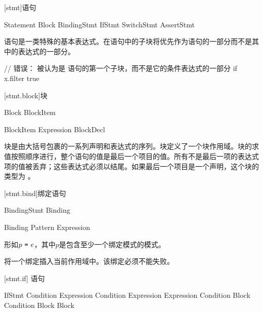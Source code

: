 
[stmt]{语句}

\begin{bnf}{Statement}
    Block \br
    BindingStmt \br
    IfStmt \br
    SwitchStmt \br
    AssertStmt
\end{bnf}

\pnum
语句是一类特殊的基本表达式。在语句中的子块将优先作为语句的一部分而不是其中的表达式的一部分。\enterexample

\begin{codeblock}
// 错误：  被认为是  语句的第一个子块，而不是它的条件表达式的一部分
if x.filter{ true }
\end{codeblock}

\exitexample

[stmt.block]{块}

\begin{bnf}{Block}
    \terminal{\{} BlockItem\bnfs\ \terminal{\}}
\end{bnf}

\begin{bnf}{BlockItem}
    Expression \terminal{;}\bnfq \br
    BlockDecl
\end{bnf}

\pnum
块是由大括号包裹的一系列声明和表达式的序列。块定义了一个块作用域。块的求值按照顺序进行，整个语句的值是最后一个项目的值。所有不是最后一项的表达式项的值被丢弃；这些表达式必须以\tcode{;}结尾。如果最后一个项目是一个声明，这个块的类型为 。

[stmt.bind]{绑定语句}

\begin{bnf}{BindingStmt}
    Binding \terminal{;}
\end{bnf}

\begin{bnf}{Binding}
    Pattern \terminal{=} Expression \terminal{;}
\end{bnf}

\pnum
{}形如$p\ \tcode{=}\ e$，其中$p$是包含至少一个绑定模式的模式。

\pnum
{}将一个绑定插入当前作用域中。该绑定必须不能失败。

[stmt.if]{ 语句}

\begin{bnf}{IfStmt}
     Condition  Expression \br
     Condition  Expression  Expression \br
     Condition Block \br
     Condition Block  Block
\end{bnf}

